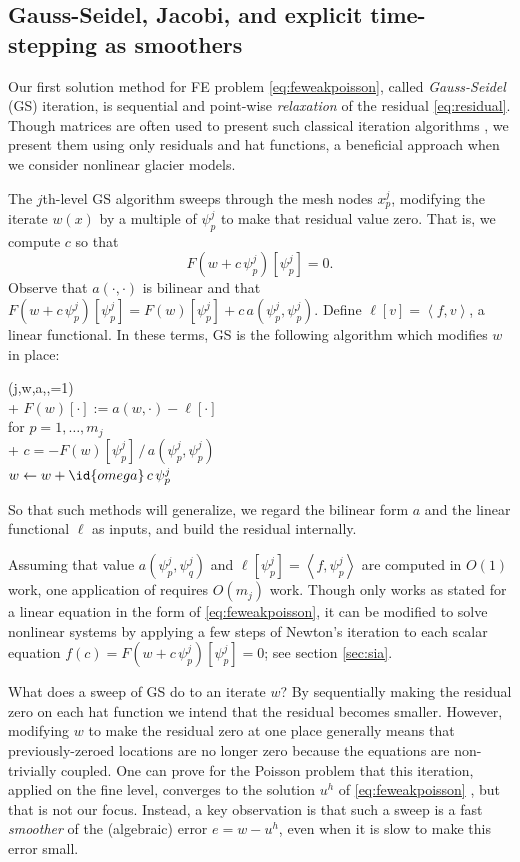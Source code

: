 \documentclass[letterpaper,final,12pt,reqno]{amsart}
\theoremstyle{claim}
\newcommand{\ip}[2]{\left<#1,#2\right>}
\numberwithin{equation}{section}
\numberwithin{figure}{section}
\numberwithin{table}{section}
\numberwithin{theorem}{section}
\begin{document}
\subsection{Gauss-Seidel, Jacobi, and explicit time-stepping as smoothers} \label{subsec:smoothers}  Our first solution method for FE problem \eqref{eq:feweakpoisson}, called \emph{Gauss-Seidel} (GS) iteration, is sequential and point-wise \emph{relaxation} of the residual \eqref{eq:residual}.  Though matrices are often used to present such classical iteration algorithms \cite[for example]{Bueler2021,Greenbaum1997}, we present them using only residuals and hat functions, a beneficial approach when we consider nonlinear glacier models.

The $j$th-level GS algorithm sweeps through the mesh nodes $x_p^j$, modifying the iterate $w(x)$ by a multiple of $\psi_p^j$ to make that residual value zero.  That is, we compute $c$ so that
\begin{equation}
  F(w+c\,\psi_p^j)[\psi_p^j] = 0.  \label{eq:gaussseidelpoint}
\end{equation}
Observe that $a(\cdot,\cdot)$ is bilinear and that $F(w+c\,\psi_p^j)[\psi_p^j] = F(w)[\psi_p^j] + c\, a(\psi_p^j,\psi_p^j)$.  Define $\ell[v] = \ip{f}{v}$, a linear functional.  In these terms, GS is the following algorithm which modifies $w$ in place:
\begin{pseudo*} \label{ps:gs-sweep}
(j,w,a,\ell,=1)\text{:} \\+
    $F(w)[\cdot] := a(w,\cdot) - \ell[\cdot]$ \\
    for $p=1,\dots,m_j$ \\+
        $\displaystyle c = - F(w)[\psi_p^j]\, \big/ \,a(\psi_p^j,\psi_p^j)$  \\
        $w \gets w + \id{omega} \,c \,\psi_p^j$
\end{pseudo*}
So that such methods will generalize, we regard the bilinear form $a$ and the linear functional $\ell$ as inputs, and build the residual internally.

Assuming that value $a(\psi_p^j,\psi_q^j)$ and $\ell[\psi_p^j] = \ip{f}{\psi_p^j}$ are computed in $O(1)$ work, one application of  requires $O(m_j)$ work.  Though  only works as stated for a linear equation in the form of \eqref{eq:feweakpoisson}, it can be modified to solve nonlinear systems by applying a few steps of Newton's iteration to each scalar equation $f(c) = F(w+c\,\psi_p^j)[\psi_p^j] = 0$; see section \ref{sec:sia}.

What does a sweep of GS do to an iterate $w$?  By sequentially making the residual zero on each hat function we intend that the residual becomes smaller.  However, modifying $w$ to make the residual zero at one place generally means that previously-zeroed locations are no longer zero because the equations are non-trivially coupled.  One can prove for the Poisson problem that this iteration, applied on the fine level, converges to the solution $u^h$ of \eqref{eq:feweakpoisson} \cite[for example]{Greenbaum1997}, but that is not our focus.  Instead, a key observation is that such a sweep is a fast \emph{smoother} of the (algebraic) error $e=w-u^h$, even when it is slow to make this error small.
\end{document}
